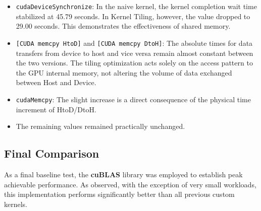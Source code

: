 \begin{itemize}
    \item \texttt{cudaDeviceSynchronize}: In the naive kernel, the kernel completion wait time stabilized at 45.79 seconds. In Kernel Tiling, however, the value dropped to 29.00 seconds. This demonstrates the effectiveness of shared memory.
    \item \texttt{[CUDA memcpy HtoD]} and \texttt{[CUDA memcpy DtoH]}: The absolute times for data transfers from device to host and vice versa remain almost constant between the two versions. The tiling optimization acts solely on the access pattern to the GPU internal memory, not altering the volume of data exchanged between Host and Device.
    \item \texttt{cudaMemcpy}: The slight increase is a direct consequence of the physical time increment of HtoD/DtoH.
    \item The remaining values remained practically unchanged.
\end{itemize}

\subsection{Final Comparison} 

As a final baseline test, the \textbf{cuBLAS} library was employed to establish peak achievable performance. As observed, with the exception of very small workloads, this implementation performs significantly better than all previous custom kernels.

